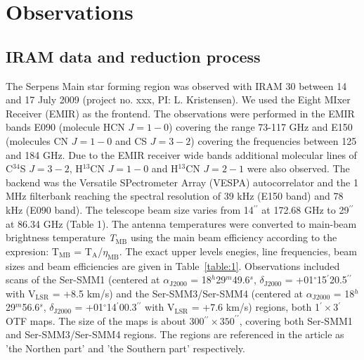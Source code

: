 \documentclass{aa}
\begin{document}
\section{Observations}

\subsection{IRAM data and reduction process}
The Serpens Main star forming region was observed with IRAM 30 between 14 and 17 July 2009 (project no. xxx, PI: L. Kristensen). We used the Eight MIxer Receiver (EMIR) as the frontend. The observations were performed in the EMIR bands E090 (molecule HCN $J=1-0$) covering the range 73-117 GHz and E150 (molecules CN $J=1-0$ and CS $J=3-2$) covering the frequencies between 125 and 184 GHz. Due to the EMIR receiver wide bands additional molecular lines of C$^{34}$S $J=3-2$, H$^{13}$CN $J=1-0$ and H$^{13}$CN $J=2-1$ were also observed. The backend was the Versatile SPectrometer Array (VESPA) autocorrelator and the 1 MHz filterbank reaching the spectral resolution of 39 kHz (E150 band) and 78 kHz (E090 band). The telescope beam size varies from 14$^{\prime\prime}$ at 172.68 GHz to 29$^{\prime\prime}$ at 86.34 GHz (Table 1). The antenna temperatures were converted to main-beam brightness temperature \textit{T$_\mathrm{MB}$} using the main beam efficiency according to the expresion: T$_\mathrm{MB}$ = T$_\mathrm{A}$/$\eta_\mathrm{MB}$. The exact upper levels enegies, line frequencies, beam sizes and beam efficiencies are given in Table~\ref{table:1}. Observations included scans of the Ser-SMM1 (centered at $\alpha_\mathrm{J2000}$ = 18$^h$29$^m$49.6$^s$, $\delta_\mathrm{J2000}$ = +01$^{\circ}$15$^{\prime}$20.5$^{\prime\prime}$ with V$_\mathrm{LSR}$ = +8.5 km/s) and the Ser-SMM3/Ser-SMM4 (centered at $\alpha_\mathrm{J2000}$ = 18$^h$29$^m$56.6$^s$, $\delta_\mathrm{J2000}$ = +01$^{\circ}$14$^{\prime}$00.3$^{\prime\prime}$ with V$_\mathrm{LSR}$ = +7.6 km/s) regions, both 1$^{\prime}\times$3$^{\prime}$ OTF maps. The size of the maps is about 300$^{\prime\prime}\times350^{\prime\prime}$, covering both Ser-SMM1 and Ser-SMM3/Ser-SMM4 regions. The regions are referenced in the article as 'the Northen part' and 'the Southern part' respectively. 
\end{document}
